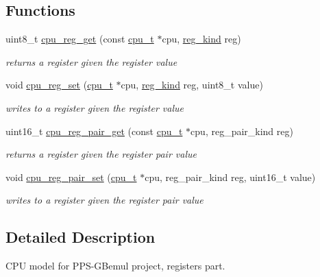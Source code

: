 \subsection*{Functions}
\begin{DoxyCompactItemize}
\item 
uint8\+\_\+t \hyperlink{cpu-registers_8h_abe62e977d253f7a6be79d0b5ca8f105f}{cpu\+\_\+reg\+\_\+get} (const \hyperlink{structcpu__t}{cpu\+\_\+t} $\ast$cpu, \hyperlink{cpu-registers_8h_ae7a73a08aaa7af3cfe957f32ef8af9d3}{reg\+\_\+kind} reg)
\begin{DoxyCompactList}\small\item\em returns a register given the register value \end{DoxyCompactList}\item 
void \hyperlink{cpu-registers_8h_a422598e03e342ec1c700cd61a3bc69b6}{cpu\+\_\+reg\+\_\+set} (\hyperlink{structcpu__t}{cpu\+\_\+t} $\ast$cpu, \hyperlink{cpu-registers_8h_ae7a73a08aaa7af3cfe957f32ef8af9d3}{reg\+\_\+kind} reg, uint8\+\_\+t value)
\begin{DoxyCompactList}\small\item\em writes to a register given the register value \end{DoxyCompactList}\item 
uint16\+\_\+t \hyperlink{cpu-registers_8h_a259712cddf80a16395900832af372953}{cpu\+\_\+reg\+\_\+pair\+\_\+get} (const \hyperlink{structcpu__t}{cpu\+\_\+t} $\ast$cpu, reg\+\_\+pair\+\_\+kind reg)
\begin{DoxyCompactList}\small\item\em returns a register given the register pair value \end{DoxyCompactList}\item 
void \hyperlink{cpu-registers_8h_aa7482c91cfc29f6a4a1ba62127f6ea35}{cpu\+\_\+reg\+\_\+pair\+\_\+set} (\hyperlink{structcpu__t}{cpu\+\_\+t} $\ast$cpu, reg\+\_\+pair\+\_\+kind reg, uint16\+\_\+t value)
\begin{DoxyCompactList}\small\item\em writes to a register given the register pair value \end{DoxyCompactList}\end{DoxyCompactItemize}


\subsection{Detailed Description}
C\+PU model for P\+P\+S-\/\+G\+Bemul project, registers part. 

